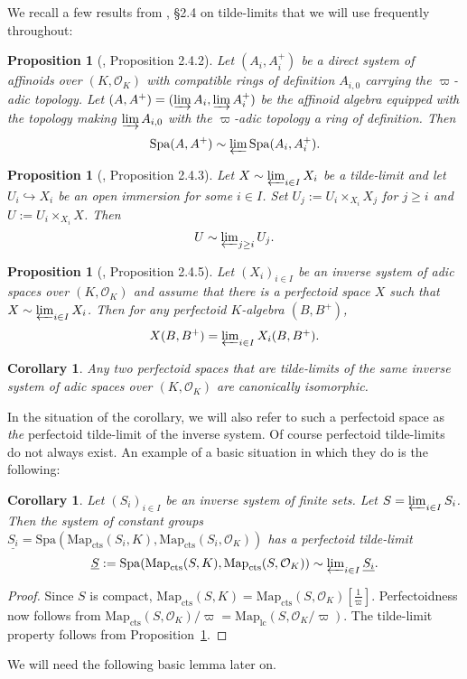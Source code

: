 \documentclass[10pt,oneside]{amsart}
\newtheorem{proposition}[theorem]{Proposition}
\newtheorem{corollary}[theorem]{Corollary}
\theoremstyle{definition}
\renewcommand{\O}{\mathcal{O}}
\begin{document}
We recall a few results from \cite{SW}, \S2.4 on tilde-limits that we will use frequently throughout:

\begin{proposition}[\cite{SW}, Proposition 2.4.2]\label{SW Proposition 2.4.2}
	Let $(A_i,A_i^{+})$ be a direct system of affinoids over $(K,\mathcal O_K)$ with compatible rings of definition $A_{i,0}$ carrying the $\varpi$-adic topology. Let $(A,A^{+})=(\varinjlim A_i,\varinjlim A_i^{+})$ be the affinoid algebra equipped with the topology making $\varinjlim A_{i,0}$ with the $\varpi$-adic topology a ring of definition. Then
	\[\operatorname{Spa}(A,A^{+})\sim \textstyle\varprojlim \operatorname{Spa}(A_i,A_i^{+}).\]
\end{proposition}
\begin{proposition}[\cite{SW}, Proposition 2.4.3]\label{SW Proposition 2.4.3}
	Let $X\sim \varprojlim_{i\in I} X_i$ be a tilde-limit and let $U_i\hookrightarrow X_i$ be an open immersion for some $i\in I$. Set $U_j:=U_i\times_{X_i}X_j$ for $j\geq i$ and $U:=U_i\times_{X_i}X$. Then 
	\[U\sim \textstyle\varprojlim_{j\geq i} U_j.\]
\end{proposition}

\begin{proposition}[\cite{SW}, Proposition 2.4.5]\label{SW Proposition 2.4.5}
	Let $(X_i)_{i\in I}$ be an inverse system of adic spaces over $(K,\mathcal O_K)$ and assume that there is a perfectoid space $X$ such that $X\sim \varprojlim_{i\in I} X_i$. Then for any perfectoid $K$-algebra $(B,B^{+})$, 
	\[X(B,B^{+})  = \textstyle\varprojlim_{i\in I}X_i(B,B^{+}).\]
\end{proposition}
\begin{corollary}\label{corollary: perfectoid tilde limit is unique}
	Any two perfectoid spaces that are tilde-limits of the same inverse system of adic spaces over $(K,\mathcal O_K)$ are canonically isomorphic.
\end{corollary}
In the situation of the corollary, we will also refer to such a perfectoid space as \textit{the} perfectoid tilde-limit of the inverse system. Of course perfectoid tilde-limits do not always exist. An example of a basic situation in which they do is the following:
\begin{corollary}\label{pro-finite-perfectoid-spaces}
	Let $(S_i)_{i\in I}$ be an inverse system of finite sets. Let $S=\varprojlim_{i\in I} S_i$. Then the system of constant groups $\underline{S_i}=\mathrm{Spa}(\mathrm{Map}_{\mathrm{cts}}(S_i,K),\mathrm{Map}_{\mathrm{cts}}(S_i,\O_K))$ has a perfectoid tilde-limit	\[\underline{S}:=\mathrm{Spa}(\mathrm{Map}_{\mathrm{cts}}(S,K),\mathrm{Map}_{\mathrm{cts}}(S,\O_K))\sim\textstyle\varprojlim_{i\in I} \underline{S_i}.\]
\end{corollary}
\begin{proof}
	Since $S$ is compact, $\mathrm{Map}_{\mathrm{cts}}(S,K)=\mathrm{Map}_{\mathrm{cts}}(S,\O_K)[\tfrac{1}{\varpi}]$. Perfectoidness now follows from $\mathrm{Map}_{\mathrm{cts}}(S,\O_K)/\varpi=\mathrm{Map}_{\mathrm{lc}}(S,\O_K/\varpi)$. The tilde-limit property follows from Proposition~\ref{SW Proposition 2.4.2}.
\end{proof}
We will need the following basic lemma later on.
\end{document}
